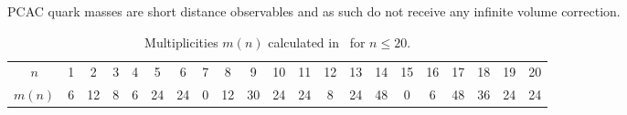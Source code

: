 PCAC quark masses are short distance observables and as such do not receive any infinite volume correction.

\begin{table}[H]
\label{apex_fv:tab:mn}
\begin{center}
    \begin{tabular}{c c c c c c c c c c c c c c c c c c c c c}
    \hline
    $n$ & 1 & 2 & 3 & 4 & 5 & 6 & 7 & 8 & 9 & 10 & 11 & 12 & 13 & 14 & 15 & 16 & 17 & 18 & 19 & 20 \\
    $m(n)$ & 6 & 12 & 8 & 6 & 24 & 24 & 0 & 12 & 30 & 24 & 24 & 8 & 24 & 48 & 0 & 6 & 48 & 36 & 24 & 24 \\
    \hline
    \end{tabular}
    \caption{Multiplicities $m(n)$ calculated in~\cite{} for $n\leq20$.}
\end{center}
\end{table}


